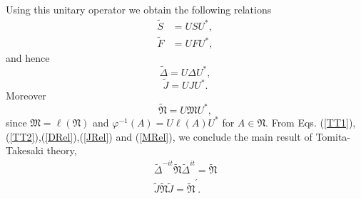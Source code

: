Using this unitary operator we obtain the following relations
\begin{equation}
\begin{split}
\tilde{S}&=US U^{\ast},\\
\tilde{F}&=UFU^\ast ,
\end{split}
\end{equation}
and hence 
\begin{equation}\label{DRel}
\tilde{\Delta}=U\Delta U^\ast,
\end{equation}
\begin{equation}\label{JRel}
\tilde{J}=UJU^\ast.
\end{equation}
Moreover  
\begin{equation}\label{MRel}
\tilde{\mathfrak{N}}=U\mathfrak{M}U^\ast,
\end{equation}
since $\mathfrak{M}=\ell(\mathfrak{N})$ and $\varphi^{-1}(A)=U\ell (A) U^\ast$ for $A\in \mathfrak{N}$.
From Eqs. (\ref{TT1}),(\ref{TT2}),(\ref{DRel}),(\ref{JRel}) and (\ref{MRel}), we conclude the main result of Tomita-Takesaki theory,
\begin{equation}
\begin{split}
\tilde{\Delta}^{-it}\tilde{\mathfrak{N}}\tilde{\Delta}^{it}=\tilde{\mathfrak{N}}\\
\tilde{J}\tilde{\mathfrak{N}}\tilde{J}=\tilde{\mathfrak{N}}^\prime.
\end{split}
\end{equation}
